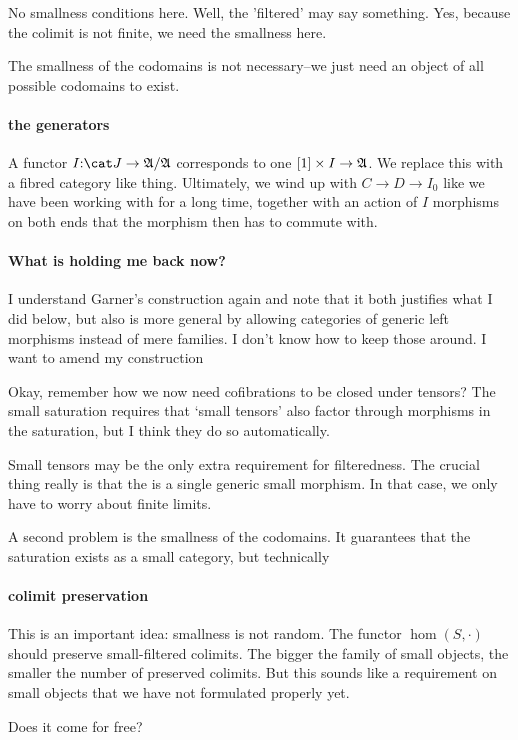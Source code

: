 \documentclass[csh.tex]{subfiles}
\begin{document}
No smallness conditions here. Well, the 'filtered' may say something.
Yes, because the colimit is not finite, we need the smallness here.

The smallness of the codomains is not necessary--we just need an object of all possible codomains to exist.

\paragraph{the generators}
A functor $I\of\cat J \to\ambient/\ambient$ corresponds to one $[1]\times I \to \mathfrak A$. We replace this with a fibred category like thing.
Ultimately, we wind up with $C\to D \to I_0$ like we have been working with for a long time, together with an action of $I$ morphisms on both ends that the morphism then has to commute with.

\paragraph{What is holding me back now?}
I understand Garner's construction again and note that it both justifies what I did below, but also is more general by allowing categories of generic left morphisms instead of mere families. I don't know how to keep those around. I want to amend my construction 

Okay, remember how we now need cofibrations to be closed under tensors? The small saturation requires that `small tensors' also factor through morphisms in the saturation, but I think they do so automatically.

Small tensors may be the only extra requirement for filteredness.
The crucial thing really is that the is a single generic small morphism. In that case, we only have to worry about finite limits.

A second problem is the smallness of the codomains. It guarantees that the saturation exists as a small category, but technically 


\paragraph{colimit preservation}
This is an important idea: smallness is not random. The functor $\hom(S,\cdot)$ should preserve small-filtered colimits. The bigger the family of small objects, the smaller the number of preserved colimits. But this sounds like a requirement on small objects that we have not formulated properly yet.

Does it come for free?
\end{document}
